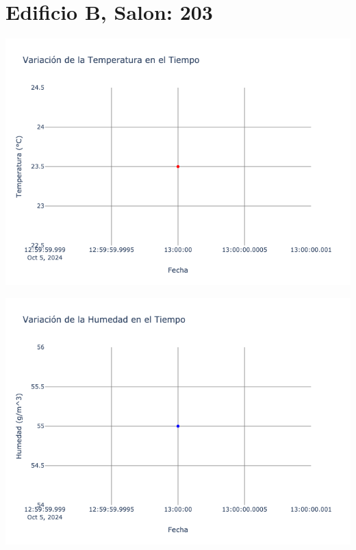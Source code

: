 \documentclass{article}
\begin{document}
    \section{Edificio B, Salon: 203}
    \noindent
    \begin{minipage}{0.48\textwidth}
        \centering
        \includegraphics[width=\textwidth]{../img/poli/TS203-90Dias-03-12-2024.png}
    \end{minipage}
    \hfill
    \begin{minipage}{0.48\textwidth}
        \centering
        \includegraphics[width=\textwidth]{../img/poli/HS203-90Dias-03-12-2024.png}
    \end{minipage}
\end{document}
